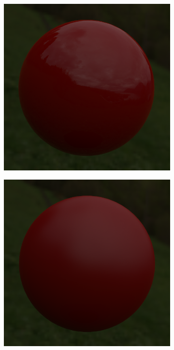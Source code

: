 \begin{figure}[!ht]
    \centering
    \begin{subfigure}[b]{0.27\textwidth}
        \centering
        \includegraphics[width=\textwidth]{images/marmoset_r1.png}
    \end{subfigure}
    \hfill
    \begin{subfigure}[b]{0.27\textwidth}
        \centering
        \includegraphics[width=\textwidth]{images/marmoset_r05.png}

\end{subfigure}
\end{figure}
